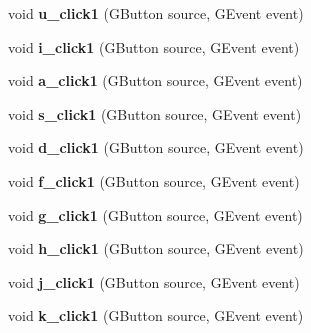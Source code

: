 \begin{DoxyCompactItemize}
\item 
\hypertarget{classkeyplayer_a30ed151da70f312b272e8a849b02987c}{void {\bfseries u\+\_\+click1} (G\+Button source, G\+Event event)}\label{classkeyplayer_a30ed151da70f312b272e8a849b02987c}

\item 
\hypertarget{classkeyplayer_a64f074a00415060451095fbdee0b6cf9}{void {\bfseries i\+\_\+click1} (G\+Button source, G\+Event event)}\label{classkeyplayer_a64f074a00415060451095fbdee0b6cf9}

\item 
\hypertarget{classkeyplayer_a9caebe1ee81401404cffab7713c03dfd}{void {\bfseries a\+\_\+click1} (G\+Button source, G\+Event event)}\label{classkeyplayer_a9caebe1ee81401404cffab7713c03dfd}

\item 
\hypertarget{classkeyplayer_a82c4b75d1a2591b20689c8c1f276cdc1}{void {\bfseries s\+\_\+click1} (G\+Button source, G\+Event event)}\label{classkeyplayer_a82c4b75d1a2591b20689c8c1f276cdc1}

\item 
\hypertarget{classkeyplayer_a011d7ce7eb3d0f45462bcb0127c509d0}{void {\bfseries d\+\_\+click1} (G\+Button source, G\+Event event)}\label{classkeyplayer_a011d7ce7eb3d0f45462bcb0127c509d0}

\item 
\hypertarget{classkeyplayer_aca00e1a17faa1075b56c8ac3fff33abf}{void {\bfseries f\+\_\+click1} (G\+Button source, G\+Event event)}\label{classkeyplayer_aca00e1a17faa1075b56c8ac3fff33abf}

\item 
\hypertarget{classkeyplayer_ae2707922d175c92f211c1920ab7cb658}{void {\bfseries g\+\_\+click1} (G\+Button source, G\+Event event)}\label{classkeyplayer_ae2707922d175c92f211c1920ab7cb658}

\item 
\hypertarget{classkeyplayer_a9f1f12fc075f6d52afd8230f032afec2}{void {\bfseries h\+\_\+click1} (G\+Button source, G\+Event event)}\label{classkeyplayer_a9f1f12fc075f6d52afd8230f032afec2}

\item 
\hypertarget{classkeyplayer_a63525c9ed4440e27c9f7ce3ea300d2de}{void {\bfseries j\+\_\+click1} (G\+Button source, G\+Event event)}\label{classkeyplayer_a63525c9ed4440e27c9f7ce3ea300d2de}

\item 
\hypertarget{classkeyplayer_a65565c04e3f2fe3f0c3996de402db97f}{void {\bfseries k\+\_\+click1} (G\+Button source, G\+Event event)}\label{classkeyplayer_a65565c04e3f2fe3f0c3996de402db97f}


\end{DoxyCompactItemize}

